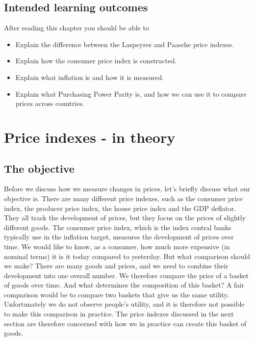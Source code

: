 \documentclass[
]{book}
\providecommand{\tightlist}{%
  \setlength{\itemsep}{0pt}\setlength{\parskip}{0pt}}
\begin{document}
\hypertarget{intended-learning-outcomes-4}{%
\subsection*{Intended learning outcomes}\label{intended-learning-outcomes-4}}

After reading this chapter you should be able to

\begin{itemize}
\tightlist
\item
  Explain the difference between the Laspeyres and Paasche price indexes.
\item
  Explain how the consumer price index is constructed.
\item
  Explain what inflation is and how it is measured.
\item
  Explain what Purchasing Power Parity is, and how we can use it to compare prices across countries.
\end{itemize}

\hypertarget{price-indexes---in-theory}{%
\section{Price indexes - in theory}\label{price-indexes---in-theory}}

\hypertarget{the-objective}{%
\subsection*{The objective}\label{the-objective}}

Before we discuss how we measure changes in prices, let's briefly discuss what our objective is. There are many different price indexes, such as the consumer price index, the producer price index, the house price index and the GDP deflator. They all track the development of prices, but they focus on the prices of slightly different goods. The consumer price index, which is the index central banks typically use in the inflation target, measures the development of prices over time. We would like to know, as a consumer, how much more expensive (in nominal terms) it is it today compared to yesterday. But what comparison should we make? There are many goods and prices, and we need to combine their development into one overall number. We therefore compare the price of a basket of goods over time. And what determines the composition of this basket? A fair comparison would be to compare two baskets that give us the same utility. Unfortunately we do not observe people's utility, and it is therefore not possible to make this comparison in practice. The price indexes discussed in the next section are therefore concerned with how we in practice can create this basket of goods.
\end{document}
